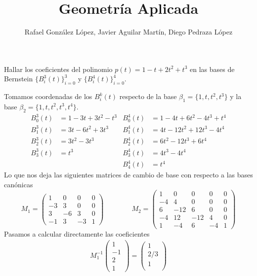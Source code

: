 \documentclass[twoside]{article}
\begin{document}
\title{Geometría Aplicada}
\author{Rafael González López, Javier Aguilar Martín, Diego Pedraza López}
\maketitle

\begin{ejercicio}{3.1}
Hallar los coeficientes del polinomio $p(t)= 1-t+2t^2+t^3$ en las bases de Bernstein $\{B_i^3(t)\}_{i=0}^3$ y $\{B_i^4(t)\}_{i=0}^4$.
\end{ejercicio}
\begin{solucion}
Tomamos coordenadas de los $B_i^k(t)$ respecto de la base $\beta_1 =\{1,t,t^2,t^3\}$ y la base $\beta_2 = \{1,t,t^2,t^3,t^4\}$.
\begin{align*}
B_0^3(t) &= 1 - 3t +3t^2 -t^3 & B_0^4(t) &= 1 -4t+6t^2-4t^3+t^4\\
B_1^3(t) & = 3t-6t^2+3t^3 & B_1^4(t) &= 4t-12t^2+12t^3-4t^4\\
B_2^3(t) &= 3t^2 -3t^3 & B_2^4(t) &= 6t^2-12t^3+6t^4\\
B_3^3(t) &= t^3 & B_3^4(t) &=4t^3-4t^4\\
 & & B_4^4(t) &= t^4
\end{align*}
Lo que nos deja las siguientes matrices de cambio de base con respecto a las bases canónicas
$$
M_1 = 
\begin{pmatrix}
1 & 0 & 0 & 0\\
-3 & 3 & 0 &0\\
3 & -6 & 3 & 0\\
-1 & 3 & -3 & 1
\end{pmatrix} \qquad \qquad  M_2 = 
\begin{pmatrix}
1  & 0   & 0   & 0  & 0\\
-4 & 4   & 0   & 0  & 0\\
6  & -12 & 6   & 0  & 0\\
-4 & 12  & -12 & 4  & 0\\
1  & -4  & 6   & -4 & 1
\end{pmatrix}
$$ 
Pasamos a calcular directamente las coeficientes
\begin{gather*}
M_1^{-1}\begin{pmatrix}
1\\
-1\\
2\\
1
\end{pmatrix}
= 
\begin{pmatrix}
1\\
2/3\\
1\\

\end{pmatrix}
\end{gather*}
\end{solucion}
\end{document}
